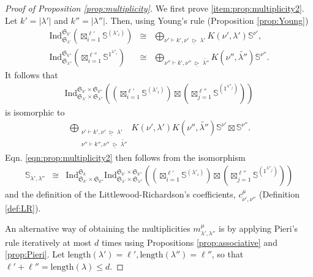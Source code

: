 \documentclass{amsart}
\theoremstyle{definition}
\theoremstyle{remark}
\numberwithin{equation}{section}
\begin{document}
\begin{proof}[Proof of Proposition \ref{prop:multiplicity}]
We first prove \eqref{item:prop:multiplicity2}.
Let $k'=|\lambda'|$ and $k'' = |\lambda''|$. Then, using 
Young's rule (Proposition \ref{prop:Young})
\begin{eqnarray*}
{\mathrm{Ind}}_{\mathfrak{S}_{\lambda'}}^{\mathfrak{S}_{k'}}\left(\boxtimes_{i=1}^{\ell'} \mathbb{S}^{(\lambda'_i)}\right)
&\cong&
\bigoplus_{\nu' \vdash k',\nu' {{\;\underline{\triangleright}\;}} \lambda'} K(\nu',\lambda')\mathbb{S}^{\nu'}, \\
{\mathrm{Ind}}_{\mathfrak{S}_{\lambda''}}^{\mathfrak{S}_{k''}}\left(\boxtimes_{i=1}^{\ell''} \mathbb{S}^{1^{\lambda''_i}}\right)
&\cong&
\bigoplus_{\nu'' \vdash k',\nu'' {{\;\underline{\triangleright}\;}} \widetilde{\lambda''}} K(\nu'',\widetilde{\lambda''})\mathbb{S}^{\nu''}.
\end{eqnarray*}
It follows that
\begin{eqnarray*}
 {\mathrm{Ind}}_{\mathfrak{S}_{\lambda'} \times \mathfrak{S}_{\lambda''}}^{\mathfrak{S}_{k'} \times \mathfrak{S}_{k''}}\left(\left(\boxtimes_{i=1}^{\ell'} \mathbb{S}^{(\lambda'_i)}\right) \boxtimes \left(\boxtimes_{j=1}^{\ell''} \mathbb{S}^{(1^{\lambda''_j})}\right) \right)
 \end{eqnarray*}
 is isomorphic to 
 \begin{eqnarray*}
 \bigoplus_{ \substack{\nu' \vdash k', \nu' {{\;\underline{\triangleright}\;}} \lambda' \\ \nu'' \vdash k'' , \nu'' {{\;\underline{\triangleright}\;}} \widetilde{\lambda''}}} K(\nu',\lambda')K(\nu'',\widetilde{\lambda''}) \mathbb{S}^{\nu'} \boxtimes \mathbb{S}^{\nu''}.
 \end{eqnarray*}
Eqn. \eqref{eqn:prop:multiplicity2} then follows from the isomorphism
\begin{eqnarray*}
\mathbb{S}_{\lambda',\lambda''} &\cong&
{\mathrm{Ind}}_{\mathfrak{S}_{k'} \times \mathfrak{S}_{k''}}^{\mathfrak{S}_k} {\mathrm{Ind}}_{\mathfrak{S}_{\lambda'} \times \mathfrak{S}_{\lambda''}}^{\mathfrak{S}_{k'} \times \mathfrak{S}_{k''}}\left(\left(\boxtimes_{i=1}^{\ell'} \mathbb{S}^{(\lambda'_i)}\right) \boxtimes \left(\boxtimes_{j=1}^{\ell''} \mathbb{S}^{(1^{\lambda''_j})}\right) \right)
\end{eqnarray*}
and the definition of the Littlewood-Richardson's coefficients, $c^{\mu}_{\nu',\nu''}$ (Definition \ref{def:LR}).

An alternative way of obtaining the multiplicities $m^{\mu}_{\lambda',\lambda''}$ is by applying
Pieri's rule iteratively at most  $d$ times using Propositions \ref{prop:associative} and \ref{prop:Pieri}.
Let ${\mathrm{length}}(\lambda') = \ell',{\mathrm{length}}(\lambda'') = \ell''$, so that 
$\ell' + \ell'' = {\mathrm{length}}(\lambda) \leq d$. 


\end{proof}
\end{document}

